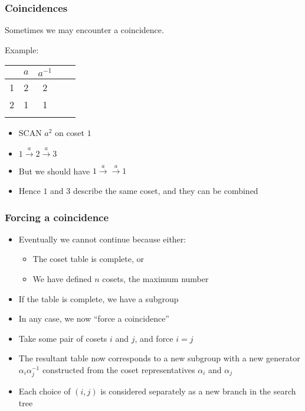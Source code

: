 \documentclass{beamer}
\begin{document}
\begin{frame}
  \frametitle{Coincidences}
  Sometimes we may encounter a coincidence.

  Example:
  \begin{table}
    \begin{tabular}{r | c c c c}
      & $a$ & $a^{-1}$ \\ \hline
      1 & 2 & 2\\
      2 & \phantom{3} 1 \phantom{1} & 1 \\ \\
    \end{tabular}
  \end{table}
  
  \begin{itemize}
  \item SCAN $a^2$ on coset $1$ 
  \item $ 1 \overset{a}{\rightarrow} 2 \overset{a}{\rightarrow} 3$ 
  \item But we should have $ 1 \overset{a}{\rightarrow} \overset{a}{\rightarrow} 1$ 
  \item Hence $1$ and $3$ describe the same coset, and they can be combined
  \end{itemize}
\end{frame}

\begin{frame}
  \frametitle{Forcing a coincidence}
  \begin{itemize}
  \item Eventually we cannot continue because either: \pause
    \begin{itemize}
    \item The coset table is complete\pause, or
    \item We have defined $n$ cosets, the maximum number \pause
    \end{itemize}
  \item If the table is complete, we have a subgroup \pause
  \item In any case, we now ``force a coincidence'' \pause
  \item Take some pair of cosets $i$ and $j$, and force $i=j$ \pause
  \item The resultant table now corresponds to a new subgroup with a new generator $\alpha_i \alpha_j^{-1}$ constructed from the coset representatives $\alpha_i$ and $\alpha_j$ \pause
  \item Each choice of $(i,j)$ is considered separately as a new branch in the search tree
  \end{itemize}
\end{frame}
\end{document}
